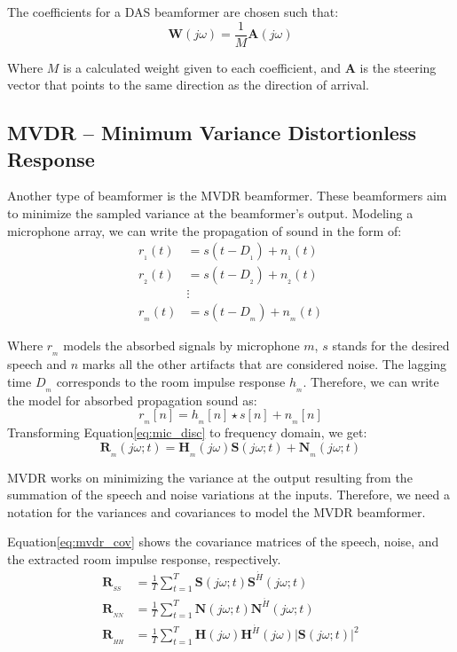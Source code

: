 The coefficients for a DAS beamformer are chosen such that:
\begin{equation}
    \mathbf{W}(j\omega) = \frac{1}{M} \mathbf{A}(j\omega)
\end{equation}

Where \(M\) is a calculated weight given to each coefficient, and
\(\mathbf{A}\) is the steering vector that points 
to the same direction as the direction of arrival.

\subsection{MVDR -- Minimum Variance Distortionless Response}
Another type of beamformer is the MVDR beamformer.
These beamformers aim to minimize the 
sampled variance at the beamformer's output. 
Modeling a microphone array, we can write the propagation of sound 
in the form of:
\begin{align}
    r_{_{1}}(t) &= s(t-D_{_{1}}) + n_{_{1}}(t) \nonumber \\
    r_{_{2}}(t) &= s(t-D_{_{2}}) + n_{_{2}}(t) \nonumber \\
    & \vdots  \nonumber \\
    r_{_{m}}(t) &= s(t-D_{_{m}}) + n_{_{m}}(t)
\end{align}

Where \(r_{_{m}}\) models the absorbed signals by microphone
\(m\), \(s\) stands for the desired speech and \(n\) 
marks all the other artifacts that are considered noise. 
The lagging time \(D_{_{m}}\) corresponds to the room impulse
response \(h_{_{m}}\). Therefore, we can write 
the model for absorbed propagation sound as:
\begin{equation}\label{eq:mic_disc}
    r_{_{m}}[n] = h_{_{m}}[n]\star s[n] + n_{_{m}}[n]
\end{equation}
Transforming Equation\;\ref{eq:mic_disc} to frequency domain,
we get:
\begin{equation}\label{eq:mic_disc}
    \mathbf{R}_{_{m}}(j\omega;t) = \mathbf{H}_{_{m}}(j\omega)\mathbf{S}(j\omega;t) + \mathbf{N}_{_{m}}(j\omega;t)
\end{equation}

MVDR works on minimizing the variance at the 
output resulting from the summation of the 
speech and noise variations at the inputs. 
Therefore, we need a notation for the variances 
and covariances to model the MVDR beamformer. 

Equation\;\ref{eq:mvdr_cov} shows the covariance matrices of the
speech, noise, and the extracted room impulse response, respectively.
\begin{align}\label{eq:mvdr_cov}
    \mathbf{R}_{_{SS}} &= \frac{1}{T}\sum_{t=1}^{T}\mathbf{S}(j\omega;t)\mathbf{S}^{\acute{H}}(j\omega;t) \nonumber \\
    \mathbf{R}_{_{NN}} &= \frac{1}{T}\sum_{t=1}^{T}\mathbf{N}(j\omega;t)\mathbf{N}^{\acute{H}}(j\omega;t)\nonumber \\
    \mathbf{R}_{_{HH}} &= \frac{1}{T}\sum_{t=1}^{T}\mathbf{H}(j\omega)\mathbf{H}^{\acute{H}}(j\omega)|\mathbf{S}(j\omega;t)|^{2} 
\end{align}

